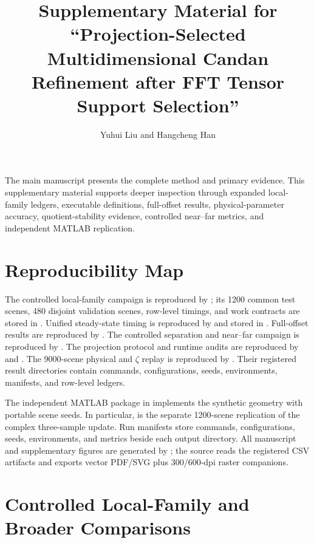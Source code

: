 \documentclass[11pt,onecolumn]{IEEEtran}
\title{Supplementary Material for ``Projection-Selected Multidimensional Candan Refinement after FFT Tensor Support Selection''}
\author{Yuhui Liu and Hangcheng Han}
\begin{document}
\maketitle

The main manuscript presents the complete method and primary evidence. This supplementary material supports deeper inspection through expanded local-family ledgers, executable definitions, full-offset results, physical-parameter accuracy, quotient-stability evidence, controlled near--far metrics, and independent MATLAB replication.

\section{Reproducibility Map}

The controlled local-family campaign is reproduced by
; its
1200 common test scenes, 480 disjoint validation scenes, row-level timings,
and work contracts are stored in
. Unified steady-state timing is reproduced by
 and stored in
. Full-offset results are reproduced by
. The controlled separation and
near--far campaign is reproduced by
. The projection protocol and runtime
audits are reproduced by  and
. The 9000-scene physical and $\zeta$
replay is reproduced by . Their
registered result directories contain commands, configurations, seeds,
environments, manifests, and row-level ledgers.

The independent MATLAB package in  implements the
synthetic geometry with portable scene seeds. In particular,
 is the separate 1200-scene replication
of the complex three-sample update. Run manifests store commands,
configurations, seeds, environments, and metrics beside each output directory.
All manuscript and supplementary figures are generated by
; the source
reads the registered CSV artifacts and exports vector PDF/SVG plus
300/600-dpi raster companions.

\section{Controlled Local-Family and Broader Comparisons}
\end{document}
